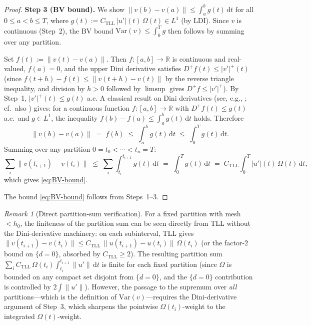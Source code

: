 \documentclass[12pt,a4paper]{article}
\theoremstyle{definition}
\theoremstyle{plain}
\theoremstyle{remark}
\newtheorem{remark}[definition]{Remark}
\newcommand{\Var}{\mathrm{Var}}
\begin{document}
\begin{proof}
\medskip
\noindent
\textbf{Step 3 (BV bound).}\;
We show $\|v(b) - v(a)\| \le \int_a^b g(t)\,\mathrm{d}t$
for all $0 \le a < b \le T$, where
$g(t) := C_{\mathrm{TLL}}\,|u'|(t)\,\Omega(t) \in L^1$
(by LDI).  Since $v$ is continuous (Step~2), the BV bound
$\Var(v) \le \int_0^T g$ then follows by summing over any
partition.

Set $f(t) := \|v(t) - v(a)\|$.  Then $f: [a,b] \to \mathbb{R}$
is continuous and real-valued,
$f(a) = 0$, and the upper Dini derivative satisfies
$D^+ f(t) \le |v'|^+(t)$ (since
$f(t+h) - f(t) \le \|v(t+h)-v(t)\|$ by the reverse triangle
inequality, and division by $h > 0$ followed by
$\limsup$ gives $D^+ f \le |v'|^+$).
By Step~1, $|v'|^+(t) \le g(t)$ a.e.
A classical result on Dini derivatives
(see, e.g., \cite[Chapter~VII, \S\S\,9--10]{Saks1937}; cf.\
also \cite[Chapter~3]{AmbrosioFuscoPallara2000}) gives:
for a continuous function $f:[a,b] \to \mathbb{R}$ with
$D^+ f(t) \le g(t)$ a.e.\ and $g \in L^1$, the inequality
$f(b) - f(a) \le \int_a^b g(t)\,\mathrm{d}t$ holds.
Therefore
\[
  \|v(b) - v(a)\| \;=\; f(b)
  \;\le\; \int_a^b g(t)\,\mathrm{d}t
  \;\le\; \int_0^T g(t)\,\mathrm{d}t.
\]
Summing over any partition $0 = t_0 < \cdots < t_n = T$:
\[
  \sum_i \|v(t_{i+1}) - v(t_i)\|
  \;\le\;
  \sum_i \int_{t_i}^{t_{i+1}} g(t)\,\mathrm{d}t
  \;=\;
  \int_0^T g(t)\,\mathrm{d}t
  \;=\;
  C_{\mathrm{TLL}} \int_0^T |u'|(t)\,\Omega(t)\,\mathrm{d}t,
\]
which gives \eqref{eq:BV-bound}.

\medskip
\noindent
The bound \eqref{eq:BV-bound} follows from Steps~1--3.
\end{proof}

\begin{remark}[Direct partition-sum verification]
\label{rem:partition-sum}
For a fixed partition with mesh $< h_0$, the finiteness of the
partition sum can be seen directly from TLL without the
Dini-derivative machinery: on each subinterval, TLL gives
$\|v(t_{i+1}) - v(t_i)\|
\le C_{\mathrm{TLL}}\,\|u(t_{i+1}) - u(t_i)\|\,\Omega(t_i)$
(or the factor-$2$ bound on $\{d = 0\}$, absorbed by
$C_{\mathrm{TLL}} \ge 2$).  The resulting partition sum
$\sum_i C_{\mathrm{TLL}}\,\Omega(t_i)\int_{t_i}^{t_{i+1}}
\|u'\|\,\mathrm{d}t$ is finite for each fixed partition
(since $\Omega$ is bounded on any compact set disjoint
from $\{d = 0\}$, and the $\{d=0\}$ contribution is
controlled by $2\int\|u'\|$).
However, the passage to the supremum over \emph{all}
partitions---which is the definition of
$\Var(v)$---requires the Dini-derivative argument of
Step~3, which sharpens the pointwise $\Omega(t_i)$-weight
to the integrated $\Omega(t)$-weight.
\end{remark}
\end{document}
